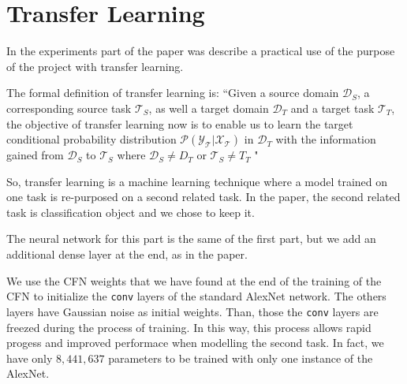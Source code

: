\section{Transfer Learning}

In the experiments part of the paper was describe a practical use of the purpose of the project with transfer learning. 

The formal definition of transfer learning is: \textquotedblleft Given a source domain $\mathcal{D}_{S}$, a corresponding source task $\mathcal{T}_{S}$, as well a target domain $\mathcal{D}_{T}$ and a target task $\mathcal{T}_{T}$, the objective of transfer learning now is to enable us to learn the target conditional probability distribution $\mathcal{P(Y_{T}|X_{T})}$ in $\mathcal{D}_{T}$ with the information gained from $\mathcal{D}_{S}$ to $\mathcal{T}_{S}$ where $\mathcal{D}_{S} \neq {D}_{T}$ or $\mathcal{T}_{S} \neq {T}_{T}$ "

So, transfer learning is a machine learning technique where a model trained on one task is re-purposed on a second related task. In the paper, the second related task is classification object and we chose to keep it.

The neural network for this part is the same of the first part, but we add an additional dense layer at the end, as in the paper.

We use the CFN weights that we have found at the end of the training of the CFN to initialize the \texttt{conv} layers of the standard AlexNet network. The others layers have Gaussian noise as initial weights. Than, those the \texttt{conv} layers are freezed during the process of training. In this way, this process allows rapid progess and improved performace when modelling the second task. In fact, we have only $8,441,637$ parameters to be trained with only one instance of the AlexNet.

